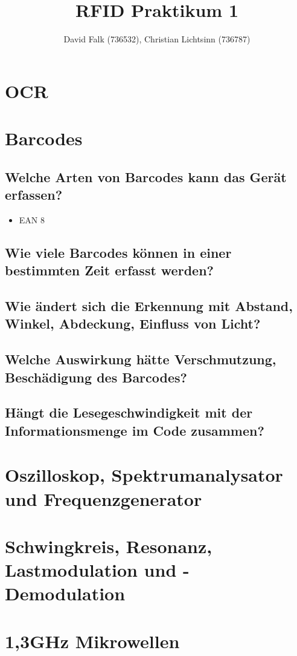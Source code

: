 \documentclass[11pt,a4paper,parskip=half]{scrartcl}
\author{David Falk (736532), Christian Lichtsinn (736787)}
\title{RFID Praktikum 1}
\begin{document}
\maketitle

\section{OCR}
\section{Barcodes}
\subsection{Welche Arten von Barcodes kann das Gerät erfassen?}
\begin{itemize}
  \item EAN 8
\end{itemize}
\subsection{Wie viele Barcodes können in einer bestimmten Zeit erfasst werden?}
\subsection{Wie ändert sich die Erkennung mit Abstand, Winkel, Abdeckung, Einfluss von Licht?}
\subsection{Welche Auswirkung hätte Verschmutzung, Beschädigung des Barcodes?}
\subsection{Hängt die Lesegeschwindigkeit mit der Informationsmenge im Code zusammen?}

\section{Oszilloskop, Spektrumanalysator und Frequenzgenerator}

\section{Schwingkreis, Resonanz, Lastmodulation und -Demodulation}

\section{1,3GHz Mikrowellen}
\end{document}
